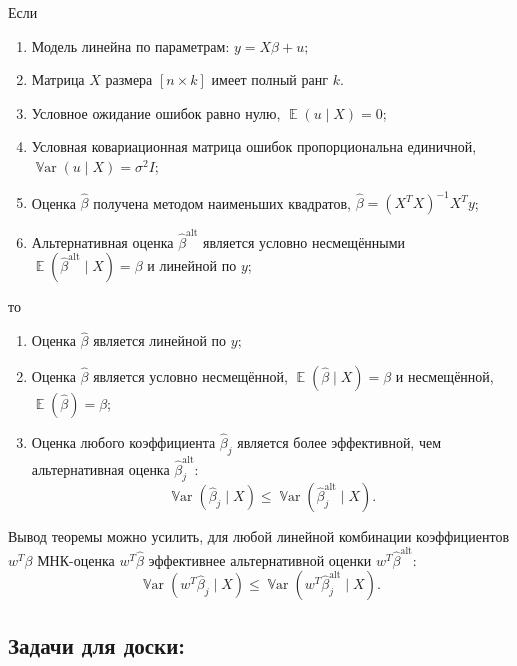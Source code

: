 \documentclass[12pt]{article}
\DeclareMathOperator{\Var}{\mathbb{V}ar}
\DeclareMathOperator{\E}{\mathbb{E}}
\renewcommand{\b}{\beta}
\newcommand{\hb}{\hat{\beta}}
\renewcommand{\u}{u}
\newcommand{\alt}{\text{alt}}
\begin{document}
\begin{theorem}
Если 
\begin{enumerate}
    \item Модель линейна по параметрам: $y = X\b + u$;
    \item Матрица $X$ размера $[n \times k]$ имеет полный ранг $k$.
    \item Условное ожидание ошибок равно нулю, $\E(\u \mid X) = 0$;
    \item Условная ковариационная матрица ошибок пропорциональна единичной, $\Var(\u \mid X) = \sigma^2 I$;
    \item Оценка $\hb$ получена методом наименьших квадратов, $\hb = (X^T X)^{-1}X^T y$;
    \item Альтернативная оценка $\hb^{\alt}$ является условно несмещёнными $\E(\hb^{\alt} \mid X) = \b$
    и линейной по $y$;
\end{enumerate}
то
\begin{enumerate}
    \item Оценка $\hb$ является линейной по $y$;
    \item Оценка $\hb$ является условно несмещённой, $\E(\hb \mid X) = \b$ и несмещённой, $\E(\hb) = \b$;
    \item Оценка любого коэффициента $\hb_j$ является более эффективной, чем альтернативная оценка $\hb_j^{\alt}$:
\[
\Var(\hb_j \mid X) \leq \Var(\hb^{\alt}_j \mid X).
\]
\end{enumerate}
\end{theorem}

Вывод теоремы можно усилить, для любой линейной комбинации коэффициентов $w^T \b$ МНК-оценка $w^T \hb$ эффективнее альтернативной оценки $w^T \hb^{\alt}$:
\[
\Var(w^T\hb_j \mid X) \leq \Var(w^T \hb^{\alt}_j \mid X).
\]


\subsection{Задачи для доски:}
\end{document}
